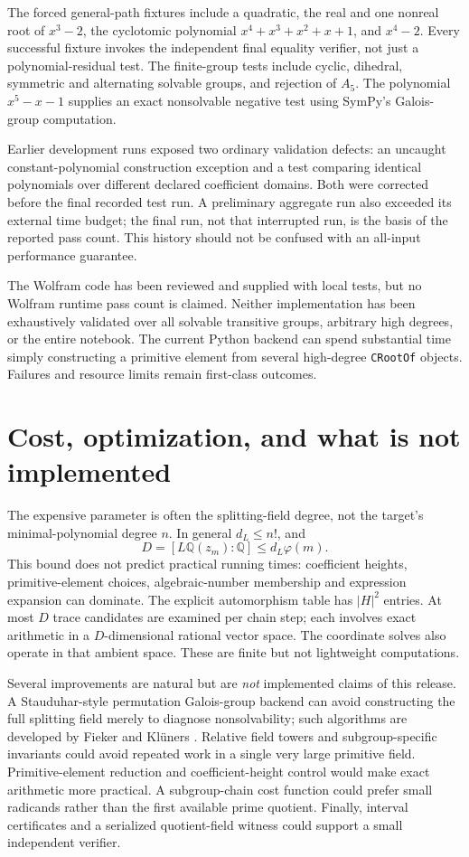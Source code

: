 \documentclass[11pt,a4paper]{article}
\newcommand{\Q}{\mathbb Q}
\newcommand{\code}[1]{\texttt{\small #1}}
\theoremstyle{definition}
\begin{document}
The forced general-path fixtures include a quadratic, the real and one nonreal
root of $x^3-2$, the cyclotomic polynomial $x^4+x^3+x^2+x+1$, and $x^4-2$.
Every successful fixture invokes the independent final equality verifier, not
just a polynomial-residual test. The finite-group tests include cyclic,
dihedral, symmetric and alternating solvable groups, and rejection of $A_5$.
The polynomial $x^5-x-1$ supplies an exact nonsolvable negative test using
SymPy's Galois-group computation.



Earlier development runs exposed two ordinary validation defects: an uncaught
constant-polynomial construction exception and a test comparing identical
polynomials over different declared coefficient domains. Both were corrected
before the final recorded test run. A preliminary aggregate run also exceeded
its external time budget; the final run, not that interrupted run, is the basis
of the reported pass count. This history should not be confused with an
all-input performance guarantee.

The Wolfram code has been reviewed and supplied with local tests, but no Wolfram
runtime pass count is claimed. Neither implementation has been exhaustively
validated over all solvable transitive groups, arbitrary high degrees, or the
entire notebook. The current Python backend can spend substantial time simply
constructing a primitive element from several high-degree \code{CRootOf}
objects. Failures and resource limits remain first-class outcomes.

\section{Cost, optimization, and what is not implemented}
The expensive parameter is often the splitting-field degree, not the target's
minimal-polynomial degree $n$. In general $d_L\le n!$, and
\[
 D=[L\Q(z_m):\Q]\le d_L\varphi(m).
\]
This bound does not predict practical running times: coefficient heights,
primitive-element choices, algebraic-number membership and expression expansion
can dominate. The explicit automorphism table has $|H|^2$ entries. At most
$D$ trace candidates are examined per chain step; each involves exact arithmetic
in a $D$-dimensional rational vector space. The coordinate solves also operate
in that ambient space. These are finite but not lightweight computations.

Several improvements are natural but are \emph{not} implemented claims of this
release. A Stauduhar-style permutation Galois-group backend can avoid constructing
the full splitting field merely to diagnose nonsolvability; such algorithms
are developed by Fieker and Kl\"uners \cite{fieker}. Relative field towers and
subgroup-specific invariants could avoid repeated work in a single very large
primitive field. Primitive-element reduction and coefficient-height control
would make exact arithmetic more practical. A subgroup-chain cost function
could prefer small radicands rather than the first available prime quotient.
Finally, interval certificates and a serialized quotient-field witness could
support a small independent verifier.
\end{document}
